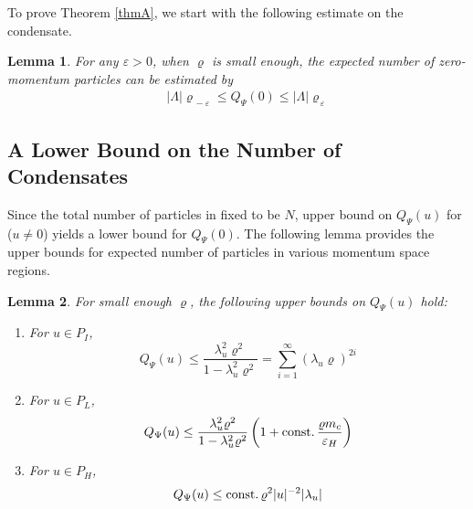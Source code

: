 \documentclass[11pt]{article}
\numberwithin{equation}{section}
\newcommand{\beq}{\begin{equation}}
\newcommand{\eeq}{\end{equation}}
\newcommand{\beqa}{\begin{eqnarray}}
\newcommand{\eeqa}{\end{eqnarray}}
\newcommand\eps{\varepsilon}
\newcommand\rhop{\rho_{\,\eps}}
\newcommand\rhom{\rho_{\,-\eps}}
\newcommand\const{{\rm const.\, }}
\renewcommand\rho\varrho
\newtheorem{lem}{Lemma}[section]
\theoremstyle{definition}
\begin{document}
%

%


To prove Theorem \ref{thmA}, we start with the following estimate on the condensate.  


\begin{lem}\label{boundspsi0}
For any $\eps> 0$, when $\rho$ is small enough, 
the expected 
number of zero-momentum particles can be estimated by 
\beqa\label{boundspsi01}
&&|\Lambda|\rhom\leq Q_\Psi\left(0 \right)\leq |\Lambda|\rhop 
\eeqa
\end{lem}


\subsection{A Lower Bound on the Number of Condensates}

Since the total number of particles in fixed to be $N$, upper bound on $Q_\Psi\left(u \right)$ for ($u\neq 0$)
yields   a lower bound for $Q_\Psi\left(0 \right)$.  %
%
The following lemma provides the upper bounds for expected number of particles in various momentum space 
regions.  


\begin{lem} \label{lem1} For small enough $\rho$,  
the following upper bounds on $ Q_\Psi(u)$ hold:
\begin{enumerate}
	 \item For $u\in P_I$, 
	 \beq\label{ubpsiuroughPM}
 Q_\Psi(u)\leq \frac{\lambda_u^2\rho^2}{1-\lambda_u^2\rho^2}=\sum_{i=1}^\infty(\lambda_u\rho)^{2i}
\eeq
\item For $u\in P_L$, 
\beq\label{ubpsiuroughPL}
 Q_\Psi(u)\leq  \frac{\lambda_u^2\rho^2}{1-\lambda_u^2\rho^2}\left(1+\const\frac{\rho m_c}{\eps_H}\right)
\eeq
\item For $u\in P_H$,  
	 \beq\label{ubpsiuroughPH}
 Q_\Psi(u)\leq\const \rho^2|u|^{-2}|\lambda_u|
\eeq
\end{enumerate}
\end{lem}
\end{document}
